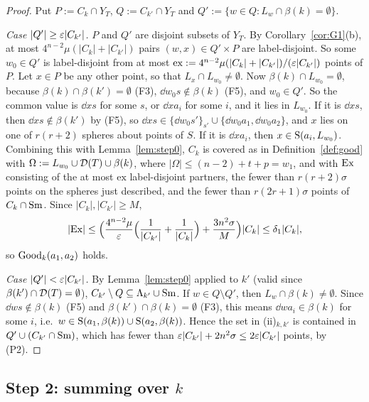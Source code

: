 \begin{proof}
Put $P:=C_k\cap Y_T$, $Q:=C_{k'}\cap Y_T$ and $Q':=\{w\in Q:L_w\cap\beta(k)=\emptyset\}$.

\emph{Case $|Q'|\ge\varepsilon|C_{k'}|$.} $P$ and $Q'$ are disjoint subsets of $Y_T$. By Corollary~\ref{cor:G1}(b), at most
$4^{n-2}\mu(|C_k|+|C_{k'}|)$ pairs $(w,x)\in Q'\times P$ are label-disjoint. So some $w_0\in Q'$ is label-disjoint
from at most $\mathrm{ex}:=4^{n-2}\mu(|C_k|+|C_{k'}|)/(\varepsilon|C_{k'}|)$ points of $P$. Let $x\in P$ be any other point,
so that $L_x\cap L_{w_0}\ne\emptyset$. Now $\beta(k)\cap L_{w_0}=\emptyset$, because $\beta(k)\cap\beta(k')=\emptyset$ (F3),
$\dd{w_0}s\notin\beta(k)$ (F5), and $w_0\in Q'$. So the common value is $\dd xs$ for some $s$, or $\dd x{a_i}$
for some $i$, and it lies in $L_{w_0}$. If it is $\dd xs$, then $\dd xs\notin\beta(k')$ by (F5), so
$\dd xs\in\{\dd{w_0}{s'}\}_{s'}\cup\{\dd{w_0}{a_1},\dd{w_0}{a_2}\}$, and $x$ lies on one of $r(r+2)$ spheres about
points of $S$. If it is $\dd x{a_i}$, then $x\in\mathrm{S}(a_i,L_{w_0})$. Combining this with Lemma~\ref{lem:step0}, $C_k$ is
covered as in Definition~\ref{def:good} with $\Omega:=L_{w_0}\cup\mathcal{D}(T)\cup\beta(k)$, where
$|\Omega|\le(n-2)+t+p=w_1$, and with $\mathrm{Ex}$ consisting of the at most $\mathrm{ex}$ label-disjoint partners, the
fewer than $r(r+2)\sigma$ points on the spheres just described, and the fewer than $r(2r+1)\sigma$ points of
$C_k\cap\mathrm{Sm}$. Since $|C_k|,|C_{k'}|\ge M$,
\[
|\mathrm{Ex}|\le\Bigl(\frac{4^{n-2}\mu}{\varepsilon}\Bigl(\frac1{|C_{k'}|}+\frac1{|C_k|}\Bigr)+\frac{3n^2\sigma}{M}\Bigr)|C_k|\le\delta_1|C_k|,
\]
so $\mathrm{Good}_k(a_1,a_2)$ holds.

\emph{Case $|Q'|<\varepsilon|C_{k'}|$.} By Lemma~\ref{lem:step0} applied to $k'$ (valid since $\beta(k')\cap\mathcal{D}(T)=\emptyset$),
$C_{k'}\setminus Q\subseteq\Lambda_{k'}\cup\mathrm{Sm}$. If $w\in Q\setminus Q'$, then $L_w\cap\beta(k)\ne\emptyset$. Since
$\dd ws\notin\beta(k)$ (F5) and $\beta(k')\cap\beta(k)=\emptyset$ (F3), this means $\dd w{a_i}\in\beta(k)$ for some
$i$, i.e.\ $w\in\mathrm{S}(a_1,\beta(k))\cup\mathrm{S}(a_2,\beta(k))$. Hence the set in (ii)$_{k,k'}$ is contained in
$Q'\cup(C_{k'}\cap\mathrm{Sm})$, which has fewer than $\varepsilon|C_{k'}|+2n^2\sigma\le2\varepsilon|C_{k'}|$ points, by (P2).
\end{proof}

\subsection{Step 2: summing over $k$}


